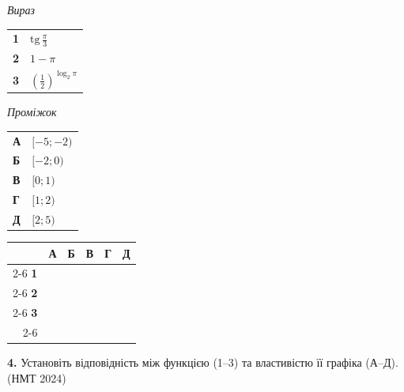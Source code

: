 \documentclass[14pt]{extarticle}
\newcommand{\answerGrid}{
    \begingroup
    \setlength{\tabcolsep}{4pt}
    \renewcommand{\arraystretch}{1.2}
    \small
    \begin{tabular}{r|c|c|c|c|c|}
         \multicolumn{1}{c}{} & \multicolumn{1}{c}{\textbf{А}} & \multicolumn{1}{c}{\textbf{Б}} & \multicolumn{1}{c}{\textbf{В}} & \multicolumn{1}{c}{\textbf{Г}} & \multicolumn{1}{c}{\textbf{Д}} \\ \cline{2-6}
         \textbf{1} & & & & & \\ \cline{2-6}
         \textbf{2} & & & & & \\ \cline{2-6}
         \textbf{3} & & & & & \\ \cline{2-6}
    \end{tabular}
    \endgroup
}
\newcommand{\nmtyear}[1]{\hfill{\small\color{yearcolor}(НМТ #1)}}
\begin{document}
\noindent
\begin{minipage}[t]{0.30\textwidth}
    \textit{Вираз} \par \vspace{0.2cm}
    \begin{tabular}{@{}p{0.5cm} l@{}}
    \textbf{1} & $\mathrm{tg}\, \displaystyle\frac{\pi}{3}$ \\[0.5cm]
    \textbf{2} & $1 - \pi$ \\[0.4cm]
    \textbf{3} & \colorbox{yellow!30}{$\left(\displaystyle\frac{1}{2}\right)^{\log_2 \pi}$} \\
    \end{tabular}
\end{minipage}%
\hfill
\begin{minipage}[t]{0.35\textwidth}
    \textit{Проміжок} \par \vspace{0.2cm}
    \begin{tabular}{@{}p{0.5cm} l@{}}
    \textbf{А} & $[-5; -2)$ \\[0.2cm]
    \textbf{Б} & $[-2; 0)$ \\[0.2cm]
    \textbf{В} & $[0; 1)$ \\[0.2cm]
    \textbf{Г} & $[1; 2)$ \\[0.2cm]
    \textbf{Д} & $[2; 5)$ \\
    \end{tabular}
\end{minipage}%
\hfill
\begin{minipage}[t]{0.30\textwidth}
    \raggedleft
    \answerGrid
\end{minipage}
\vspace{0.7cm}

\noindent\textbf{4.} Установіть відповідність між функцією (1–3) та властивістю її графіка (А–Д). \nmtyear{2024}
\vspace{0.3cm}
\end{document}
